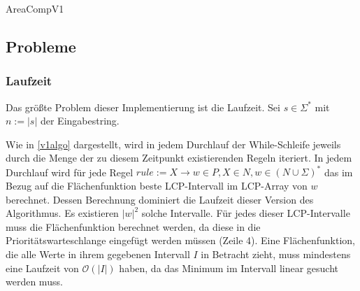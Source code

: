 \begin{algorithm}[t]
    \caption{AreaCompV1}
    \label{v1algo}
\end{algorithm}

\subsection{Probleme}

\subsubsection{Laufzeit}
\label{v1problemruntime}

Das größte Problem dieser Implementierung ist die Laufzeit. Sei $s \in \Sigma^*$ mit $n := |s|$ der Eingabestring.

Wie in \autoref{v1algo} dargestellt, wird in jedem Durchlauf der While-Schleife jeweils durch die Menge der zu diesem Zeitpunkt existierenden Regeln iteriert. 
In jedem Durchlauf wird für jede Regel $rule := X \rightarrow w \in P, X \in N, w \in (N \cup \Sigma)^*$ das im Bezug auf die Flächenfunktion beste LCP-Intervall im LCP-Array von $w$ berechnet. Dessen Berechnung dominiert die Laufzeit dieser Version des Algorithmus. 
Es existieren $|w|^2$ solche Intervalle. Für jedes dieser LCP-Intervalle muss die Flächenfunktion berechnet werden, da diese in die Prioritätswarteschlange eingefügt werden müssen (Zeile 4). Eine Flächenfunktion, die alle Werte in ihrem gegebenen Intervall $I$ in Betracht zieht, muss mindestens eine Laufzeit von $\mathcal{O}(|I|)$ haben, da das Minimum im Intervall linear gesucht werden muss.


